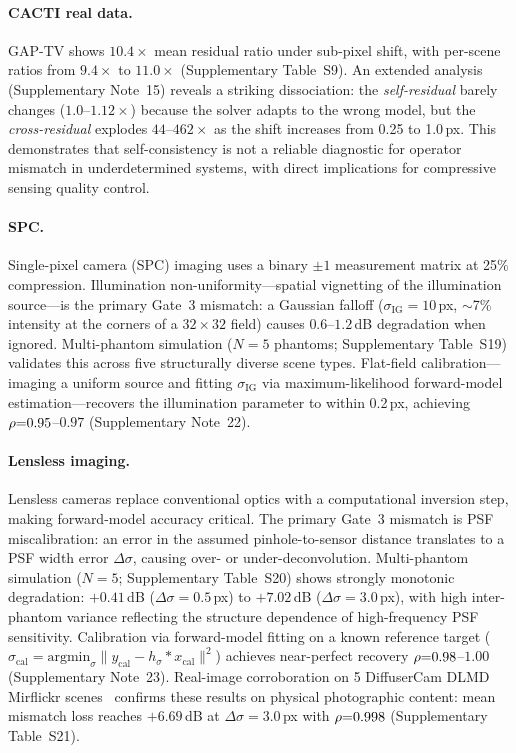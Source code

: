 \paragraph{CACTI real data.}
GAP-TV shows $10.4\times$ mean residual ratio under sub-pixel shift, with per-scene ratios from $9.4\times$ to $11.0\times$ (Supplementary Table~S9). An extended analysis (Supplementary Note~15) reveals a striking dissociation: the \emph{self-residual} barely changes ($1.0$--$1.12\times$) because the solver adapts to the wrong model, but the \emph{cross-residual} explodes $44$--$462\times$ as the shift increases from 0.25 to 1.0\,px. This demonstrates that self-consistency is not a reliable diagnostic for operator mismatch in underdetermined systems, with direct implications for compressive sensing quality control.

\paragraph{SPC.}
Single-pixel camera (SPC) imaging uses a binary $\pm 1$ measurement matrix at 25\% compression. Illumination non-uniformity---spatial vignetting of the illumination source---is the primary Gate~3 mismatch: a Gaussian falloff ($\sigma_\mathrm{IG}{=}10$\,px, $\sim$7\% intensity at the corners of a $32{\times}32$ field) causes $0.6$--$1.2$\,dB degradation when ignored. Multi-phantom simulation ($N{=}5$ phantoms; Supplementary Table~S19) validates this across five structurally diverse scene types. Flat-field calibration---imaging a uniform source and fitting $\sigma_\mathrm{IG}$ via maximum-likelihood forward-model estimation---recovers the illumination parameter to within 0.2\,px, achieving $\rho{=}0.95$--$0.97$ (Supplementary Note~22).

\paragraph{Lensless imaging.}
Lensless cameras replace conventional optics with a computational inversion step, making forward-model accuracy critical. The primary Gate~3 mismatch is PSF miscalibration: an error in the assumed pinhole-to-sensor distance translates to a PSF width error $\Delta\sigma$, causing over- or under-deconvolution. Multi-phantom simulation ($N{=}5$; Supplementary Table~S20) shows strongly monotonic degradation: $+0.41$\,dB ($\Delta\sigma{=}0.5$\,px) to $+7.02$\,dB ($\Delta\sigma{=}3.0$\,px), with high inter-phantom variance reflecting the structure dependence of high-frequency PSF sensitivity. Calibration via forward-model fitting on a known reference target ($\sigma_\mathrm{cal} = \mathrm{argmin}_\sigma \|y_\mathrm{cal} - h_\sigma * x_\mathrm{cal}\|^2$) achieves near-perfect recovery $\rho{=}0.98$--$1.00$ (Supplementary Note~23). Real-image corroboration on 5 DiffuserCam DLMD Mirflickr scenes~\cite{Antipa2018} confirms these results on physical photographic content: mean mismatch loss reaches $+6.69$\,dB at $\Delta\sigma{=}3.0$\,px with $\rho{=}0.998$ (Supplementary Table~S21).

